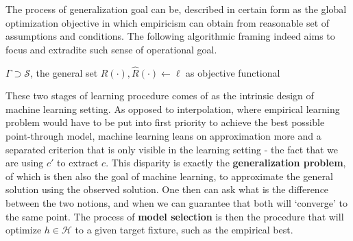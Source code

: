 \documentclass[
  journal=largetwo,
  year=2025,
  volume=37,
]{cup-journal}
\begin{document}
The process of generalization goal can be, described in certain form as the global optimization objective in which empiricism can obtain from reasonable set of assumptions and conditions. The following algorithmic framing indeed aims to focus and extradite such sense of operational goal. 

\begin{algorithm}[htb]
    \renewcommand{\algorithmcfname}{Optimization problem}
    \caption{Empirical-generalization learning dynamics (non-proxy)}
    \Begin
    {
        $\Gamma\supset \mathcal{S}$, the general set\;
        $R(\cdot),\hat{R}(\cdot)\gets\ell$ as objective functional\;
    }
    \label{algo:algo_optim_ideal}
\end{algorithm}

These two stages of learning procedure comes of as the intrinsic design of machine learning setting. As opposed to interpolation, where empirical learning problem would have to be put into first priority to achieve the best possible point-through model, machine learning leans on approximation more and a separated criterion that is only visible in the learning setting - the fact that we are using $c'$ to extract $c$. This disparity is exactly the \textbf{generalization problem}, of which is then also the goal of machine learning, to approximate the general solution using the observed solution. One then can ask what is the difference between the two notions, and when we can guarantee that both will `converge' to the same point. The process of \textbf{model selection} is then the procedure that will optimize $h\in \mathcal{H}$ to a given target fixture, such as the empirical best. 
\end{document}
